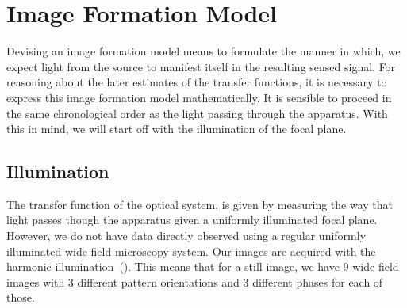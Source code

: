 \section[Image Formation]{Image Formation Model}%

Devising an image formation model means to formulate the manner in which, we expect light from the source to manifest 
    itself in the resulting sensed signal.
For reasoning about the later estimates of the transfer functions, it is necessary to express this image formation model
    mathematically.
It is sensible to proceed in the same chronological order as the light passing through the apparatus.
With this in mind, we will start off with the illumination of the focal plane.

\subsection{Illumination}%
The transfer function of the optical system, is given by measuring the way that light passes though the apparatus given 
    a uniformly illuminated focal plane.
However, we do not have data directly observed using a regular uniformly illuminated wide field microscopy system.
Our images are acquired with the harmonic illumination~(). 
This means that for a still image, we have 9 wide field images with 3 different 
    pattern orientations and 3 different phases for each of those.

